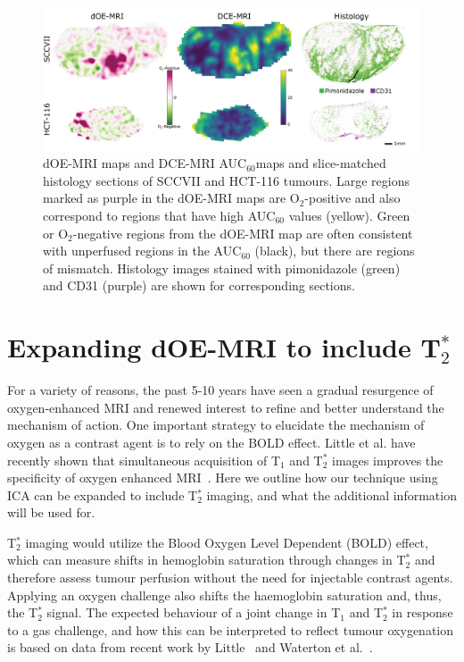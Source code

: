 \begin{figure}[htbp]
   \centering
   \includegraphics[width=\textwidth]{futurework/futurework-images/fig_perfusion.png} %
   \caption{\ac{dOE-MRI} maps and DCE-MRI \acs{AUC}$_{60}$maps and slice-matched histology sections of SCCVII and HCT-116 tumours. Large regions marked as purple in the \ac{dOE-MRI} maps are O$_2$-positive and also correspond to regions that have high \acs{AUC}$_{60}$ values (yellow). Green or O$_2$-negative regions from the \acs{dOE-MRI} map are often consistent with unperfused regions in the \acs{AUC}$_{60}$ (black), but there are regions of mismatch. Histology images stained with pimonidazole (green) and CD31 (purple) are shown for corresponding sections.
   \label{fig_perfusion}}
\end{figure}

\section{Expanding \acs{dOE-MRI} to include T$_2^*$}


For a variety of reasons, the past 5-10 years have seen a gradual resurgence of oxygen-enhanced MRI and renewed interest to refine and better understand the mechanism of action.
One important strategy to elucidate the mechanism of oxygen as a contrast agent is to rely on the \acs{BOLD} effect. 
Little et al. have recently shown that simultaneous acquisition of T$_1$ and T$_2^*$ images improves the specificity of oxygen enhanced MRI~\cite{Little:2018iu}.
Here we outline how our technique using \acs{ICA} can be expanded to include T$_2^*$ imaging, and what the additional information will be used for.

T$_2^*$ imaging would utilize the Blood Oxygen Level Dependent (\acs{BOLD}) effect, which can measure shifts in hemoglobin saturation through changes in T$_2^*$ and therefore assess tumour perfusion without the need for injectable contrast agents. 
Applying an oxygen challenge also shifts the haemoglobin saturation and, thus, the T$_2^*$ signal. 
The expected behaviour of a joint change in T$_1$ and T$_2^*$ in response to a gas challenge, and how this can be interpreted to reflect tumour oxygenation is based on data from recent work by Little~\cite{Little:2018iu} and Waterton et al.~\cite{OConnor:2019fc}. 

